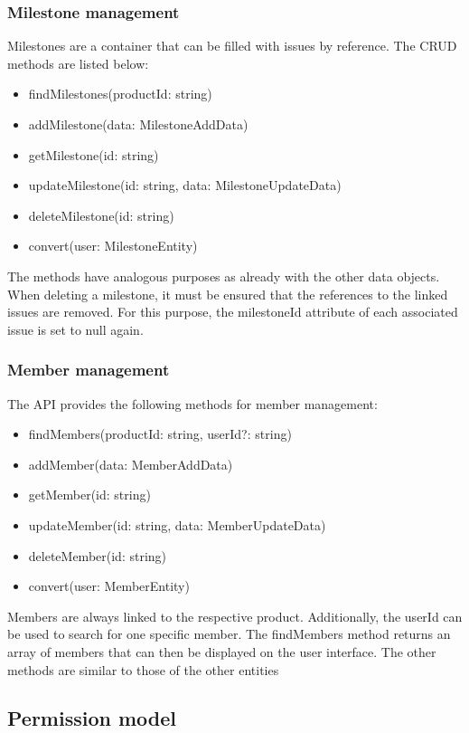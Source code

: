     \subsubsection*{Milestone management}
    Milestones are a container that can be filled with issues by reference. The CRUD methods are listed below:
    \begin{itemize}
        \item findMilestones(productId: string)
        \item addMilestone(data: MilestoneAddData)
        \item getMilestone(id: string)
        \item updateMilestone(id: string, data: MilestoneUpdateData)
        \item deleteMilestone(id: string)
        \item convert(user: MilestoneEntity)
    \end{itemize}
    The methods have analogous purposes as already with the other data objects. When deleting a milestone, it must be ensured that the references to the linked issues are removed. For this purpose, the milestoneId attribute of each associated issue is set to null again.

    \subsubsection*{Member management}
    The API provides the following methods for member management:
    \begin{itemize}
        \item findMembers(productId: string, userId?: string)
        \item addMember(data: MemberAddData)
        \item getMember(id: string)
        \item updateMember(id: string, data: MemberUpdateData)
        \item deleteMember(id: string)
        \item convert(user: MemberEntity)
    \end{itemize}
    Members are always linked to the respective product. Additionally, the userId can be used to search for one specific member. The findMembers method returns an array of members that can then be displayed on the user interface.
    The other methods are similar to those of the other entities

 

    \subsection*{Permission model}

